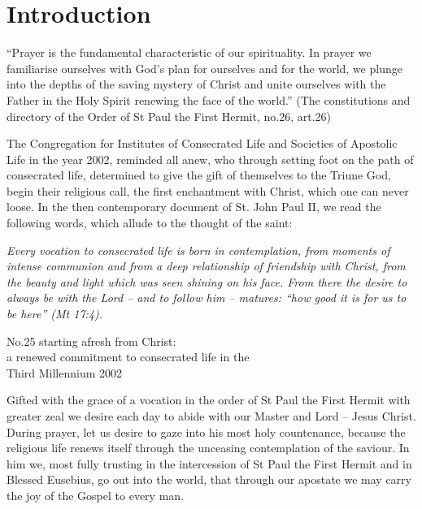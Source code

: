 
\section*{Introduction} 

\setlength{\parskip}{1em}

{``Prayer is the fundamental characteristic of our spirituality. In prayer we familiarise ourselves with God's plan for ourselves and for the world, we plunge into the depths of the saving mystery of Christ and unite ourselves with the Father in the Holy Spirit renewing the face of the world.'' (The constitutions and directory of the Order of St Paul the First Hermit, no.26, art.26)\par}

{The Congregation for Institutes of Consecrated Life and Societies of Apostolic Life in the year 2002, reminded all anew, who through setting foot on the path of consecrated life, determined to give the gift of themselves to the Triune God, begin their religious call, the first enchantment with Christ, which one can never loose. In the then contemporary document of St. John Paul II, we read the following words, which allude to the thought of the saint:\par}

\begin{addmargin}[2em]{2em}
\textit{Every vocation to consecrated life is born in contemplation, from moments of intense communion and from a deep relationship of friendship with Christ, from the beauty and light which was seen shining on his face. From there the desire to always be with the Lord -- and to follow him -- matures: ``how good it is for us to be here'' (Mt 17:4).}
\end{addmargin}

\begin{flushright}
No.25 starting afresh from Christ: \\ a renewed commitment to consecrated life in the  \\ Third Millennium 2002
\end{flushright}


{Gifted with the grace of a vocation in the order of St Paul the First Hermit with greater zeal we desire each day to abide with our Master and Lord -- Jesus Christ. During prayer, let us desire to gaze into his most holy countenance, because the religious life renews itself through the unceasing contemplation of the saviour. In him we, most fully trusting in the intercession of St Paul the First Hermit and in Blessed Eusebius, go out into the world, that through our apostate we may carry the joy of the Gospel to every man.\par}


